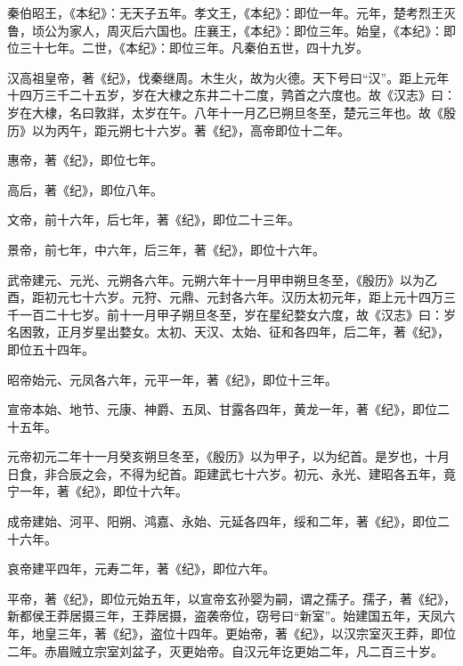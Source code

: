 \documentclass[12pt,UTF8]{ctexbook}
\begin{document}
秦伯昭王，《本纪》：无天子五年。孝文王，《本纪》：即位一年。元年，楚考烈王灭鲁，顷公为家人，周灭后六国也。庄襄王，《本纪》：即位三年。始皇，《本纪》：即位三十七年。二世，《本纪》：即位三年。凡秦伯五世，四十九岁。



汉高祖皇帝，著《纪》，伐秦继周。木生火，故为火德。天下号曰“汉”。距上元年十四万三千二十五岁，岁在大棣之东井二十二度，鹑首之六度也。故《汉志》曰：岁在大棣，名曰敦牂，太岁在午。八年十一月乙巳朔旦冬至，楚元三年也。故《殷历》以为丙午，距元朔七十六岁。著《纪》，高帝即位十二年。



惠帝，著《纪》，即位七年。



高后，著《纪》，即位八年。



文帝，前十六年，后七年，著《纪》，即位二十三年。



景帝，前七年，中六年，后三年，著《纪》，即位十六年。



武帝建元、元光、元朔各六年。元朔六年十一月甲申朔旦冬至，《殷历》以为乙酉，距初元七十六岁。元狩、元鼎、元封各六年。汉历太初元年，距上元十四万三千一百二十七岁。前十一月甲子朔旦冬至，岁在星纪婺女六度，故《汉志》曰：岁名困敦，正月岁星出婺女。太初、天汉、太始、征和各四年，后二年，著《纪》，即位五十四年。



昭帝始元、元凤各六年，元平一年，著《纪》，即位十三年。



宣帝本始、地节、元康、神爵、五凤、甘露各四年，黄龙一年，著《纪》，即位二十五年。



元帝初元二年十一月癸亥朔旦冬至，《殷历》以为甲子，以为纪首。是岁也，十月日食，非合辰之会，不得为纪首。距建武七十六岁。初元、永光、建昭各五年，竟宁一年，著《纪》，即位十六年。



成帝建始、河平、阳朔、鸿嘉、永始、元延各四年，绥和二年，著《纪》，即位二十六年。



哀帝建平四年，元寿二年，著《纪》，即位六年。



平帝，著《纪》，即位元始五年，以宣帝玄孙婴为嗣，谓之孺子。孺子，著《纪》，新都侯王莽居摄三年，王莽居摄，盗袭帝位，窃号曰“新室”。始建国五年，天凤六年，地皇三年，著《纪》，盗位十四年。更始帝，著《纪》，以汉宗室灭王莽，即位二年。赤眉贼立宗室刘盆子，灭更始帝。自汉元年讫更始二年，凡二百三十岁。
\end{document}
